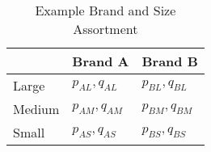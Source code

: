\begin{table}[] \centering
\caption{Example Brand and Size Assortment}
\label{tab:identification1}
\begin{tabular}{lll}
          & \textbf{Brand A} & \textbf{Brand B} \\
\hline
Large     & $p_{AL}, q_{AL}$ & $p_{BL}, q_{BL}$  \\
Medium    & $p_{AM}, q_{AM}$ & $p_{BM}, q_{BM}$  \\
Small     & $p_{AS}, q_{AS}$ & $p_{BS}, q_{BS}$  \\
  \end{tabular}
\end{table}
